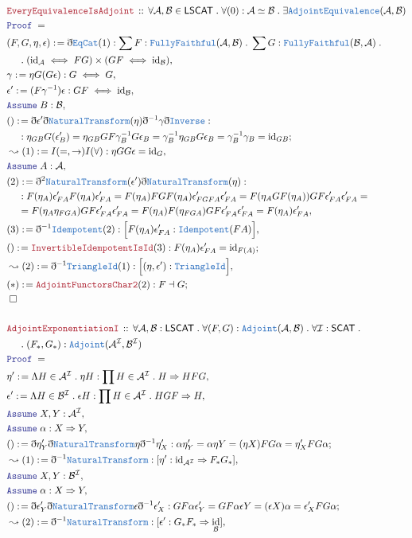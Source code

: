\documentclass[12pt]{scrartcl}
\newcommand{\TYPE}[1]{\textcolor{NavyBlue}{\mathtt{#1}}}
\newcommand{\LOGIC}[1]{\textcolor{Blue}{\mathtt{#1}}}
\newcommand{\THM}[1]{\textcolor{Maroon}{\mathtt{#1}}}
\renewcommand{\.}{\; . \;}
\newcommand{\de}{: \kern 0.1pc =}
\newcommand{\Theorem}[2]{& \THM{#1} \, :: \, #2 \\ & \Proof = \\ }
\newcommand{\NewLine}{\\ & \kern 1pc}
\newcommand{\Page}[1]{ \begin{align*} #1 \end{align*}   }
\newcommand{ \bd }{ \ByDef }
\DeclareMathOperator*{\id}{id}
\newcommand{\Say}[3]{& #1 \de #2 : #3, \\}
\newcommand{\Conclude}[3]{& #1 \de #2 : #3; \\}
\newcommand{\Derive}[3]{& \leadsto #1 \de #2 : #3, \\}
\newcommand{\Assume}[2]{& \LOGIC{Assume} \; #1 : #2, \\}
\newcommand{\QED}{\; \square}
\newcommand{\EndProof}{& \QED \\}
\newcommand{\ByDef}{\eth}
\newcommand{\Proof}{\LOGIC{Proof} \; }
\newcommand{\NT}{\TYPE{NaturalTransform}}
\newcommand{\A}{\mathcal{A}}
\newcommand{\B}{\mathcal{B}}
\newcommand{\I}{\mathcal{I}}
\begin{document}
\Page{
	\Theorem{EveryEquivalenceIsAdjoint}{\forall \A,\B \in \mathsf{LSCAT} \. \forall (0) : \A \simeq \B \.   
		\exists \TYPE{AdjointEquivalence}(\A,\B)}
	\Say{(F,G,\eta,\epsilon)}{ \bd \TYPE{EqCat}(1) }
	{ \sum F : \TYPE{FullyFaithful}(\A, \B) \. \sum G : \TYPE{FullyFaithful}(\B,\A) \. \NewLine \. 
		({\id}_\A \iff FG) \times (GF \iff {\id}_\B) }
	\Say{\gamma}{ \eta G (G \epsilon)    }{    G  \iff G    }
	\Say{\epsilon'}{  (F\gamma^{-1}) \epsilon  }{ GF \iff  {\id}_\B }
	\Assume{B}{\B}
	\Conclude{()}{  \bd \epsilon' \bd \NT(\eta) \bd^{-1} \gamma \bd \TYPE{Inverse}       }
	{    
		\NewLine :
		\eta_{GB} G(\epsilon'_B) =  
		\eta_{GB} GF\gamma^{-1}_B G\epsilon_B =   
		\gamma^{-1}_B \eta_{GB} G \epsilon_B =
		\gamma^{-1}_B \gamma_B =
		{\id}_{GB}
	}
	\Derive{(1)}{ I(=,\to)I(\forall)   }{  \eta G G \epsilon = {\id}_{G}      }
	\Assume{A}{\A}
	\Say{(2)}{ \bd^2 \NT (\epsilon') \bd \NT(\eta)     }
	{   
		\NewLine :
		F(\eta_A)\epsilon'_{FA}F(\eta_A)\epsilon'_{FA}  = 
		F(\eta_A)FGF(\eta_A)\epsilon'_{FGFA}\epsilon'_{FA}  =
		F( \eta_A GF(\eta_A) ) GF \epsilon'_{FA} \epsilon'_{FA} = \NewLine = 
		F( \eta_A \eta_{FGA} ) GF \epsilon'_{FA} \epsilon'_{FA} = 
		F( \eta_A ) F(\eta_{FGA}) GF \epsilon'_{FA} \epsilon'_{FA} = 
		F(\eta_A)   \epsilon'_{FA}
	}
	\Say{(3)}{\bd^{-1} \TYPE{Idempotent}(2) }{ \Big[  F(\eta_A)\epsilon'_{FA} : \TYPE{Idempotent}(FA) \Big]   }
	\Conclude{()}{\THM{InvertibleIdempotentIsId}(3)}{  F(\eta_A)\epsilon'_{FA} = {\id}_{F(A)}   }
	\Derive{(2)}{\bd^{-1}\TYPE{TriangleId}(1)}{\Big[ (\eta,\epsilon') : \TYPE{TriangleId} \Big]}
	\Conclude{(*)}{\THM{AdjointFunctorsChar2}(2)}{  F \dashv G }
	\EndProof
	\\
	\Theorem{AdjointExponentiationI}{
		\forall \A,\B : \mathsf{LSCAT} \. 
		\forall (F,G) : \TYPE{Adjoint}(\A,\B) \.  
		\forall \I : \mathsf{SCAT} \.  \NewLine \. 
		(F_*, G_*) : \TYPE{Adjoint}(\A^\I,\B^\I)
	}
	\Say{\eta'}{  \Lambda H \in \A^\I \.  \eta H  }{  \prod H \in \A^\I \. H \Rightarrow HFG }
	\Say{\epsilon'}{ \Lambda H \in \B^\I \. \epsilon H }{ \prod H \in \A^\I  \. HGF \Rightarrow H }
	\Assume{X,Y}{\A^\I}
	\Assume{\alpha}{X \Rightarrow Y}
	\Conclude{ ()  }{\bd \eta'_Y \bd \NT \eta \bd^{-1} \eta'_X}
	{  
		\alpha \eta'_Y = 
		\alpha \eta Y  =
		(\eta X) FG \alpha =
		\eta'_X FG \alpha 
	}
	\Derive{(1)}{\bd^{-1}\NT}{[ \eta' : {\id}_{\A^\I} \Rightarrow F_*G_*  ]}
	\Assume{X,Y}{\B^\I}
	\Assume{\alpha}{X \Rightarrow Y}
	\Conclude{ ()  }{\bd \epsilon'_Y \bd \NT \epsilon \bd^{-1} \epsilon'_X}
	{  
		GF\alpha \epsilon'_Y = 
		GF\alpha \epsilon Y  =
		(\epsilon X) \alpha =
		\epsilon'_X FG \alpha 
	}
	\Derive{(2)}{\bd^{-1}\NT}{[ \epsilon' :  G_*F_* \Rightarrow {\id_{\B}}  ]}
}
\end{document}
